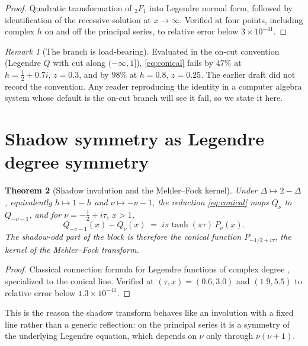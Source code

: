 \documentclass[12pt,a4paper]{article}
\theoremstyle{plain}
\newtheorem{theorem}{Theorem}[section]
\theoremstyle{definition}
\theoremstyle{remark}
\newtheorem{remark}[theorem]{Remark}
\begin{document}
\begin{proof}
Quadratic transformation of ${}_2F_1$ into Legendre normal form,
followed by identification of the recessive solution at $x\to\infty$.
Verified at four points, including complex $h$ on and off the principal
series, to relative error below $3\times10^{-41}$.
\end{proof}

\begin{remark}[The branch is load-bearing]
\label{rem:branch}
Evaluated in the on-cut convention (Legendre $Q$ with cut along
$(-\infty,1]$), \eqref{eq:conical} fails by $47\%$ at
$h=\tfrac12+0.7i,\,z=0.3$, and by $98\%$ at $h=0.8,\,z=0.25$. The
earlier draft did not record the convention. Any reader reproducing the
identity in a computer algebra system whose default is the on-cut
branch will see it fail, so we state it here.
\end{remark}

\section{Shadow symmetry as Legendre degree symmetry}

\begin{theorem}[Shadow involution and the Mehler--Fock kernel]
\label{thm:shadow}
Under $\Delta\mapsto2-\Delta$, equivalently $h\mapsto1-h$ and
$\nu\mapsto-\nu-1$, the reduction \eqref{eq:conical} maps $Q_\nu$ to
$Q_{-\nu-1}$, and for $\nu=-\tfrac12+i\tau$, $x>1$,
\begin{equation}
Q_{-\nu-1}(x)-Q_\nu(x)\;=\;i\pi\tanh(\pi\tau)\,P_\nu(x).
\label{eq:connection}
\end{equation}
The shadow-odd part of the block is therefore the conical function
$P_{-1/2+i\tau}$, the kernel of the Mehler--Fock transform.
\end{theorem}

\begin{proof}
Classical connection formula for Legendre functions of complex degree
\cite{Erdelyi}, specialized to the conical line. Verified at
$(\tau,x)=(0.6,3.0)$ and $(1.9,5.5)$ to relative error below
$1.3\times10^{-41}$.
\end{proof}

This is the reason the shadow transform behaves like an involution with
a fixed line rather than a generic reflection: on the principal series
it is a symmetry of the underlying Legendre equation, which depends on
$\nu$ only through $\nu(\nu+1)$.
\end{document}
